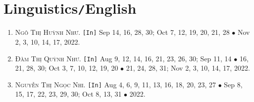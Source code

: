 \documentclass{article}
\numberwithin{equation}{section}
\begin{document}
\section{Linguistics\texttt{/}English}
\begin{enumerate}
	\item \textsc{Ngô Thị Huỳnh Như.} \texttt{[In]} Sep 14, 16, 28, 30; Oct 7, 12, 19, 20, 21, 28 $\bullet$ Nov 2, 3, 10, 14, 17, 2022.
	\item \textsc{Đàm Thị Quỳnh Như.} \texttt{[In]} Aug 9, 12, 14, 16, 21, 23, 26, 30; Sep 11, 14 $\bullet$ 16, 21, 28, 30; Oct 3, 7, 10, 12, 19, 20 $\bullet$ 21, 24, 28, 31; Nov 2, 3, 10, 14, 17, 2022.
	\item \textsc{Nguyễn Thị Ngọc Nhi.} \texttt{[In]} Aug 4, 6, 9, 11, 13, 16, 18, 20, 23, 27 $\bullet$ Sep 8, 15, 17, 22, 23, 29, 30; Oct 8, 13, 31 $\bullet$ 2022.
\end{enumerate}


\printbibliography[heading=bibintoc]
	
\end{document}
